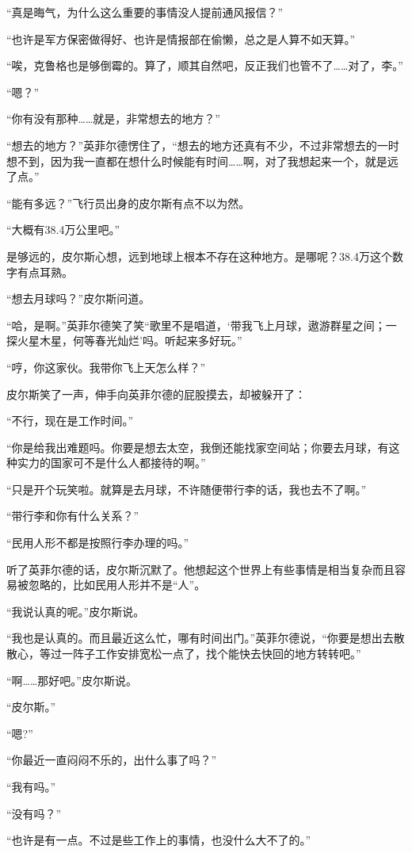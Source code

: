 “真是晦气，为什么这么重要的事情没人提前通风报信？”

“也许是军方保密做得好、也许是情报部在偷懒，总之是人算不如天算。”

“唉，克鲁格也是够倒霉的。算了，顺其自然吧，反正我们也管不了……对了，李。”

“嗯？”

“你有没有那种……就是，非常想去的地方？”

“想去的地方？”英菲尔德愣住了，“想去的地方还真有不少，不过非常想去的一时想不到，因为我一直都在想什么时候能有时间……啊，对了我想起来一个，就是远了点。”

“能有多远？”飞行员出身的皮尔斯有点不以为然。

“大概有38.4万公里吧。”

是够远的，皮尔斯心想，远到地球上根本不存在这种地方。是哪呢？38.4万这个数字有点耳熟。

“想去月球吗？”皮尔斯问道。

“哈，是啊。”英菲尔德笑了笑“歌里不是唱道，‘带我飞上月球，遨游群星之间；一探火星木星，何等春光灿烂’吗。听起来多好玩。”

“哼，你这家伙。我带你飞上天怎么样？”

皮尔斯笑了一声，伸手向英菲尔德的屁股摸去，却被躲开了：

“不行，现在是工作时间。”

“你是给我出难题吗。你要是想去太空，我倒还能找家空间站；你要去月球，有这种实力的国家可不是什么人都接待的啊。”

“只是开个玩笑啦。就算是去月球，不许随便带行李的话，我也去不了啊。”

“带行李和你有什么关系？”

“民用人形不都是按照行李办理的吗。”

听了英菲尔德的话，皮尔斯沉默了。他想起这个世界上有些事情是相当复杂而且容易被忽略的，比如民用人形并不是“人”。

“我说认真的呢。”皮尔斯说。

“我也是认真的。而且最近这么忙，哪有时间出门。”英菲尔德说，“你要是想出去散散心，等过一阵子工作安排宽松一点了，找个能快去快回的地方转转吧。”

“啊……那好吧。”皮尔斯说。

“皮尔斯。”

“嗯?”

“你最近一直闷闷不乐的，出什么事了吗？”

“我有吗。”

“没有吗？”

“也许是有一点。不过是些工作上的事情，也没什么大不了的。”

